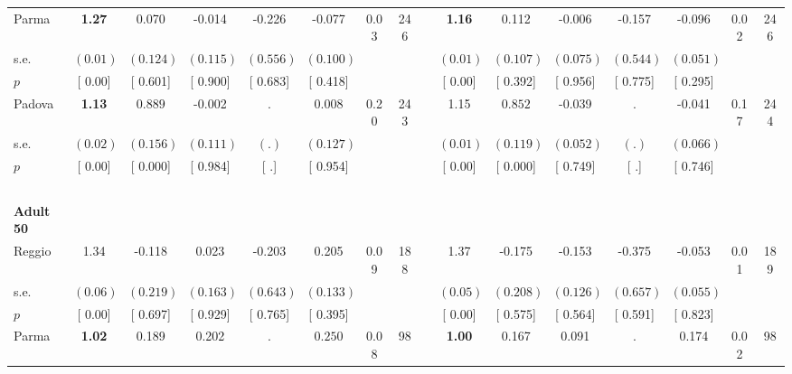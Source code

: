 \begin{longtable}{L{8em} c c c c c c c p{1em} c c c c c c c}
\quad \quad \quad Parma& \textbf{     1.27} &     0.070 &    -0.014 &    -0.226 &    -0.077 &      0.03 &       246 & & \textbf{     1.16} &     0.112 &    -0.006 &    -0.157 &    -0.096 &      0.02 &       246  \\*
\quad \quad \quad \quad s.e.& $ (     0.01)$ & $ (    0.124)$ & $ (    0.115)$ & $ (    0.556)$ & $ (    0.100)$ & & & & $ (     0.01)$ & $ (    0.107)$ & $ (    0.075)$ & $ (    0.544)$ & $ (    0.051)$ & &  \\*
\quad \quad \quad \quad $ p$ & [     0.00] & [    0.601] & [    0.900] & [    0.683] & [    0.418] & & & & [     0.00] & [    0.392] & [    0.956] & [    0.775] & [    0.295] & &  \\[1em]
\quad \quad \quad Padova& \textbf{     1.13} & $ \mathbf{    0.889}$ &    -0.002 &         . &     0.008 &      0.20 &       243 & & 1.15 & $ \mathbf{    0.852}$ &    -0.039 &         . &    -0.041 &      0.17 &       244  \\*
\quad \quad \quad \quad s.e.& $ (     0.02)$ & $ (    0.156)$ & $ (    0.111)$ & $ (        .)$ & $ (    0.127)$ & & & & $ (     0.01)$ & $ (    0.119)$ & $ (    0.052)$ & $ (        .)$ & $ (    0.066)$ & &  \\*
\quad \quad \quad \quad $ p$ & [     0.00] & [    0.000] & [    0.984] & [        .] & [    0.954] & & & & [     0.00] & [    0.000] & [    0.749] & [        .] & [    0.746] & &  \\[1em]
~\\[1em]
\quad \quad \textbf{Adult 50} & & & & & & & & & & & & & & & \\* 
\quad \quad \quad Reggio& 1.34 &    -0.118 &     0.023 &    -0.203 &     0.205 &      0.09 &       188 & & 1.37 &    -0.175 &    -0.153 &    -0.375 &    -0.053 &      0.01 &       189  \\*
\quad \quad \quad \quad s.e.& $ (     0.06)$ & $ (    0.219)$ & $ (    0.163)$ & $ (    0.643)$ & $ (    0.133)$ & & & & $ (     0.05)$ & $ (    0.208)$ & $ (    0.126)$ & $ (    0.657)$ & $ (    0.055)$ & &  \\*
\quad \quad \quad \quad $ p$ & [     0.00] & [    0.697] & [    0.929] & [    0.765] & [    0.395] & & & & [     0.00] & [    0.575] & [    0.564] & [    0.591] & [    0.823] & &  \\[1em]
\quad \quad \quad Parma& \textbf{     1.02} &     0.189 &     0.202 &         . & $ \mathbf{    0.250}$ &      0.08 &        98 & & \textbf{     1.00} &     0.167 &     0.091 &         . &     0.174 &      0.02 &        98  \\*

\end{longtable}
